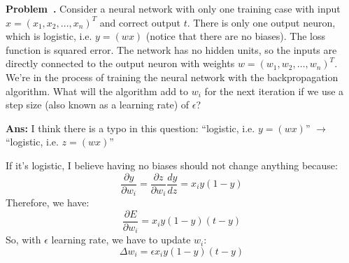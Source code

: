 \documentclass{article}
\newcounter{problem}[section]
\newenvironment{problem}[1][]{\refstepcounter{problem}\par\medskip
   \noindent \textbf{Problem~\theproblem. #1} \rmfamily}{\medskip}
\newenvironment{proof}{\begin{mdframed}\textbf{Ans:}}{ \end{mdframed}}
\begin{document}
\begin{problem}
    Consider a neural network with only one training case with input $x=(x_1 , x_2 , \dots , x_n )^T$ and correct output $t$. 
    There is only one output neuron, which is logistic, i.e. $y=(wx)$ (notice that there are no biases). 
    The loss function is squared error. The network has no hidden units, so the inputs are directly connected to the output neuron with weights $w = (w_1 , w_2 , \dots , w_n )^T $. We’re in the process of training the neural network with the backpropagation algorithm. What will the algorithm add to $w_i$ for the next iteration if we use a step size (also known as a learning rate) of $\epsilon$?
\end{problem}
\begin{proof}
    I think there is a typo in this question: ``logistic, i.e. $y=(wx)$'' $\rightarrow$ ``logistic, i.e. $z=(wx)$''

    If it's logistic, I believe having no biases should not change anything because:
    \begin{equation}
        \frac{\partial y}{\partial w_i} = \frac{\partial z}{\partial w_i}\frac{dy}{dz} = x_iy(1-y)
    \end{equation}
    Therefore, we have:
    \begin{equation}
        \frac{\partial E}{\partial w_i} = x_iy(1-y)(t-y)
    \end{equation}
    So, with $\epsilon$ learning rate, we have to update $w_i$: 
    \begin{equation}
        \Delta w_i = \epsilon x_iy(1-y)(t-y)
    \end{equation}
\end{proof}
\end{document}
